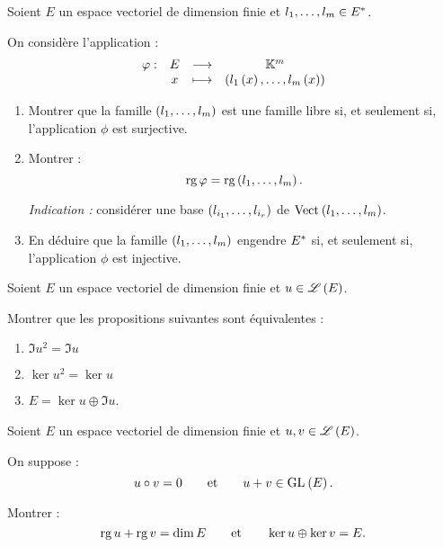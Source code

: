 \begin{exo}
Soient \(E\) un espace vectoriel de dimension finie et \(l_1,\dots,l_m\in E^{*}\).

On considère l'application : \[\begin{array}[t]{cccc}\varphi : & E & \longrightarrow & \mathbb{K}^m \\ & x & \longmapsto & \left(l_1\left(x\right),\dots,l_m\left(x\right)\right)\end{array}\]

\begin{enumerate}
\item Montrer que la famille \(\left(l_1,\dots,l_m\right)\) est une famille libre si, et seulement si, l'application \(\phi\) est surjective. \\

\item Montrer : \[\operatorname{rg}\varphi=\operatorname{rg}\left(l_1,\dots,l_m\right).\]

\textit{Indication :} considérer une base \(\left(l_{i_1},\dots,l_{i_r}\right)\) de \(\Vect{l_1,\dots,l_m}\). \\

\item En déduire que la famille \(\left(l_1,\dots,l_m\right)\) engendre \(E^{*}\) si, et seulement si, l'application \(\phi\) est injective.
\end{enumerate}
\end{exo}

\begin{corr}
\end{corr}

\begin{exo}
Soient \(E\) un espace vectoriel de dimension finie et \(u\in\mathscr{L}\left(E\right)\).

Montrer que les propositions suivantes sont équivalentes :

\begin{enumerate}
\item \(\Im u^2=\Im u\) \\

\item \(\ker u^2=\ker u\) \\

\item \(E=\ker u\oplus\Im u\).
\end{enumerate}
\end{exo}

\begin{corr}
\end{corr}

\begin{exo}
Soient \(E\) un espace vectoriel de dimension finie et \(u,v\in\mathscr{L}\left(E\right)\).

On suppose : \[u\rond v=0\qquad\text{et}\qquad u+v\in\GL{}[E].\]

Montrer : \[\operatorname{rg} u+\operatorname{rg} v=\dim E\qquad\text{et}\qquad\ker u\oplus\ker v=E.\]
\end{exo}

\begin{corr}
\end{corr}